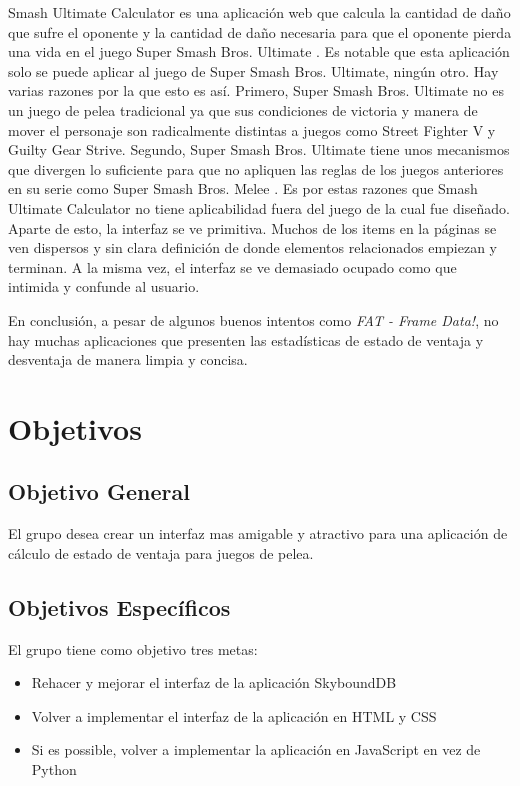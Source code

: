 Smash Ultimate Calculator es una aplicación web que calcula la cantidad de daño que sufre el oponente y la cantidad de daño necesaria para que el oponente pierda una vida en el juego Super Smash Bros. Ultimate \cite{noauthor_super_2022}. Es notable que esta aplicación solo se puede aplicar al juego de Super Smash Bros. Ultimate, ningún otro. Hay varias razones por la que esto es así. Primero, Super Smash Bros. Ultimate no es un juego de pelea tradicional ya que sus condiciones de victoria y manera de mover el personaje son radicalmente distintas a juegos como Street Fighter V y Guilty Gear Strive. Segundo, Super Smash Bros. Ultimate tiene unos mecanismos que divergen lo suficiente para que no apliquen las reglas de los juegos anteriores en su serie como Super Smash Bros. Melee \cite{noauthor_super_2022}. Es por estas razones que Smash Ultimate Calculator no tiene aplicabilidad fuera del juego de la cual fue diseñado. Aparte de esto, la interfaz se ve primitiva. Muchos de los items en la páginas se ven dispersos y sin clara definición de donde elementos relacionados empiezan y terminan. A la misma vez, el interfaz se ve demasiado ocupado como que intimida y confunde al usuario.

En conclusión, a pesar de algunos buenos intentos como \textit{FAT - Frame Data!}, no hay muchas aplicaciones que presenten las estadísticas de estado de ventaja y desventaja de manera limpia y concisa.

\section{Objetivos}

\subsection{Objetivo General} 

El grupo desea crear un interfaz mas amigable y atractivo para una aplicación de cálculo de estado de ventaja para juegos de pelea.

\subsection{Objetivos Específicos}

El grupo tiene como objetivo tres metas:
\begin{itemize}
    \item Rehacer y mejorar el interfaz de la aplicación SkyboundDB \cite{aramis-matos_skybounddb_2022}
    \item Volver a implementar el interfaz de la aplicación en HTML y CSS
    \item Si es possible, volver a implementar la aplicación en JavaScript en vez de Python
\end{itemize}

